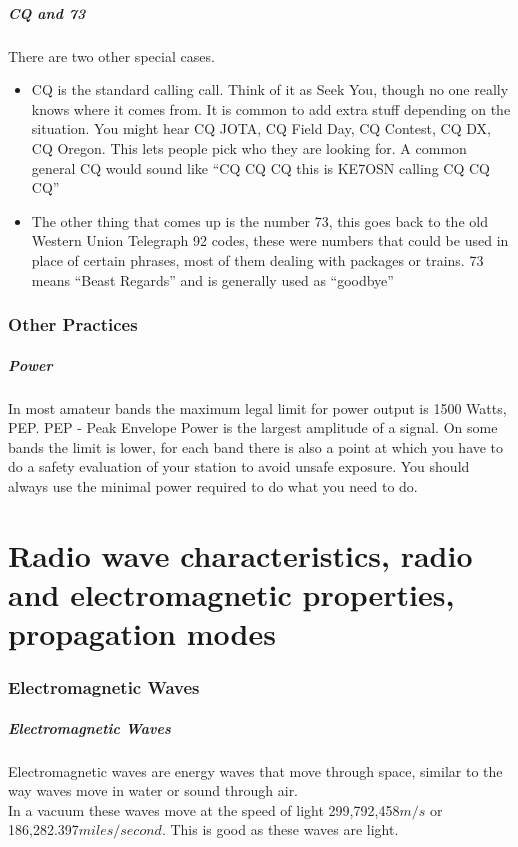 \documentclass[10pt]{beamer}
\begin{document}
\begin{frame}
\frametitle{CQ and 73}
There are two other special cases.
\begin{itemize}
\item CQ is the standard calling call. Think of it as Seek You, though no one really knows where it comes from. It is common to add extra stuff depending on the situation. You might hear CQ JOTA, CQ Field Day, CQ Contest, CQ DX, CQ Oregon. This lets people pick who they are looking for. A common general CQ would sound like ``CQ CQ CQ this is KE7OSN calling CQ CQ CQ''
\item The other thing that comes up is the number 73, this goes back to the old Western Union Telegraph 92 codes, these were numbers that could be used in place of certain phrases, most of them dealing with packages or trains. 73 means ``Beast Regards'' and is generally used as ``goodbye''
\end{itemize}
\end{frame}

\section{Other Practices}

\begin{frame}
\frametitle{Power}
In most amateur bands the maximum legal limit for power output is 1500 Watts, PEP. PEP - Peak Envelope Power is the largest amplitude of a signal. On some bands the limit is lower, for each band there is also a point at which you have to do a safety evaluation of your station to avoid unsafe exposure. You should always use the minimal power required to do what you need to do.
\end{frame}

\part{Radio wave characteristics, radio and electromagnetic properties, propagation modes}
\section{Electromagnetic Waves}
\begin{frame}
\frametitle{Electromagnetic Waves}
Electromagnetic waves are energy waves that move through space, similar to the way waves move in water or sound through air.\\
In a vacuum these waves move at the speed of light 299,792,458$m/s$ or 186,282.397$miles/second$. This is good as these waves are light.
\end{frame}
\end{document}
